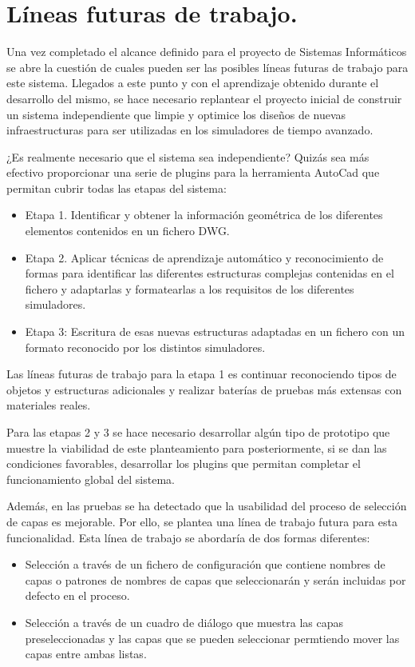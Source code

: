 \section{Líneas futuras de trabajo.}

Una vez completado el alcance definido para el proyecto de Sistemas Informáticos se abre la cuestión de cuales pueden ser las posibles líneas futuras de trabajo para este sistema. Llegados a este punto y con el aprendizaje obtenido durante el desarrollo del mismo, se hace necesario replantear el proyecto inicial de construir un sistema independiente que limpie y optimice los diseños de nuevas infraestructuras para ser utilizadas en los simuladores de tiempo avanzado. 

¿Es realmente necesario que el sistema sea independiente? Quizás sea más efectivo proporcionar una serie de plugins para la herramienta AutoCad que permitan cubrir todas las etapas del sistema:

\begin{itemize}

\item{Etapa 1. Identificar y obtener la información geométrica de los diferentes elementos contenidos en un fichero DWG.}
\item{Etapa 2. Aplicar técnicas de aprendizaje automático y reconocimiento de formas para identificar las diferentes estructuras complejas contenidas en el fichero y adaptarlas y formatearlas a los requisitos de los diferentes simuladores.}
\item{Etapa 3: Escritura de esas nuevas estructuras adaptadas en un fichero con un formato reconocido por los distintos simuladores.}

\end{itemize}

Las líneas futuras de trabajo para la etapa 1 es continuar reconociendo tipos de objetos y estructuras adicionales y realizar baterías de pruebas más extensas con materiales reales.

Para las etapas 2 y 3 se hace necesario desarrollar algún tipo de prototipo que muestre la viabilidad de este planteamiento para posteriormente, si se dan las condiciones favorables, desarrollar los plugins que permitan completar el funcionamiento global del sistema.

Además, en las pruebas se ha detectado que la usabilidad del proceso de selección de capas es mejorable. Por ello, se plantea una línea de trabajo futura para esta funcionalidad. Esta línea de trabajo se abordaría de dos formas diferentes:

\begin{itemize}

\item{Selección a través de un fichero de configuración que contiene nombres de capas o patrones de nombres de capas que seleccionarán y serán incluidas por defecto en el proceso.}

\item{Selección a través de un cuadro de diálogo que muestra las capas preseleccionadas y las capas que
se pueden seleccionar permtiendo mover las capas entre ambas listas.}

\end{itemize}